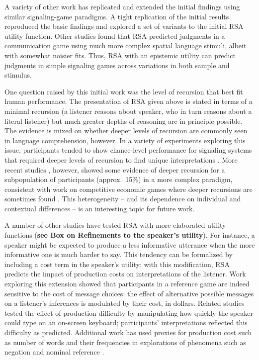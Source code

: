 \documentclass[]{elsarticle}
\begin{document}
A variety of other work has replicated and extended the initial findings
using similar signaling-game paradigms. A tight replication of the
initial results \citep{qing2015} reproduced the basic findings and
explored a set of variants to the initial RSA utility function.
Other studies \citep{carstensen2014} found that RSA
predicted judgments in a communication game using much more complex
spatial language stimuli, albeit with somewhat noisier fits. Thus, RSA
with an epistemic utility can predict judgments in simple signaling
games across variations in both sample and stimulus.

One question raised by this initial work was the level of recursion that
best fit human performance. The presentation of RSA given above is
stated in terms of a minimal recursion (a listener reasons about
speaker, who in turn reasons about a literal listener) but much greater
depths of reasoning are in principle possible. The evidence is mixed on whether deeper levels of recursion are commonly seen in language comprehension, however. In a variety of experiments exploring this issue, participants tended to show chance-level performance for signaling systems that required deeper levels of
recursion to find unique interpretations \citep{stiller2011,degen2012,vogel2013}. More recent studies \citep{franke2016},
however, showed some evidence of deeper recursion
for a subpopulation of participants (approx.~15\%) in a more
complex paradigm, consistent with work on competitive economic
games where deeper recursions are sometimes found \citep{camerer2004}. This heterogeneity -- and its dependence
on individual and contextual differences -- is an interesting topic for
future work.

A number of other studies have tested RSA with more elaborated utility functions (\textbf{see Box on Refinements to the speaker’s utility}). For instance, a speaker might be expected to
produce a less informative utterance when the more informative one is
much harder to say. This tendency can be formalized by including a cost
term in the speaker's utility; with this modification, RSA
predicts the impact of production costs on interpretations of the
listener. Work exploring this extension \citep{bergen2012} showed that participants in a reference
game are indeed sensitive to the cost of
message choices: the effect of alternative possible messages on a listener's inferences is modulated by their cost, in dollars. Related studies \citep{degen2013} tested the effect of production
difficulty by manipulating how quickly the speaker could type on an
on-screen keyboard; participants' interpretations reflected this difficulty
as predicted. Additional work has used proxies for production cost
such as number of words and their frequencies in explorations of phenomena such as negation and nominal reference \citep{nordmeyer2014,graf2016}.
\end{document}

